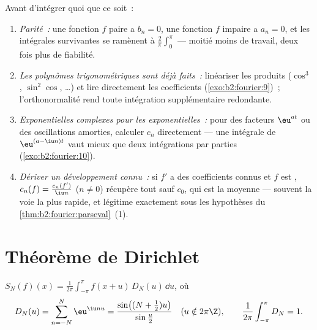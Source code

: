 \begin{method}\label{met:b2:fourier:coefficients}
Avant d'intégrer quoi que ce soit~:
\begin{enumerate}
  \item \emph{Parité~:} une fonction $f$ paire a $b_n = 0$, une
        fonction $f$ impaire a $a_n = 0$, et les intégrales
        survivantes se ramènent à $\frac2\pi \int_0^\pi$ --- moitié
        moins de travail, deux fois plus de fiabilité.
  \item \emph{Les polynômes trigonométriques sont déjà faits~:}
        linéariser les produits ($\cos^3$, $\sin^2\cos$, \dots) et
        lire directement les coefficients
        (\cref{exo:b2:fourier:9})~; l'orthonormalité rend toute
        intégration supplémentaire redondante.
  \item \emph{Exponentielles complexes pour les exponentielles~:}
        pour des facteurs $\eu^{at}$ ou des oscillations amorties,
        calculer $c_n$ directement --- une intégrale de $\eu^{(a -
        \iu n)t}$ vaut mieux que deux intégrations par parties
        (\cref{exo:b2:fourier:10}).
  \item \emph{Dériver un développement connu~:} si $f'$ a des
        coefficients connus et $f$ est , $c_n(f) =
        \frac{c_n(f')}{\iu n}$ ($n \neq 0$) récupère tout sauf
        $c_0$, qui est la moyenne --- souvent la voie la plus
        rapide, et légitime exactement sous les hypothèses du
        \cref{thm:b2:fourier:parseval}~(1).
\end{enumerate}
\end{method}

\section{Théorème de Dirichlet}

\begin{lemma}\label{lem:b2:fourier:kernel}
$S_N(f)(x) = \frac{1}{2\pi}\int_{-\pi}^{\pi} f(x + u)\,D_N(u)\,\dd
u$, où
\[
D_N(u) = \sum_{n=-N}^{N} \eu^{\iu nu}
= \frac{\sin\bigl((N + \frac12)u\bigr)}{\sin\frac u2}
\quad (u \notin 2\pi\Z),
\qquad
\frac{1}{2\pi}\int_{-\pi}^{\pi} D_N = 1 .
\]
\end{lemma}

